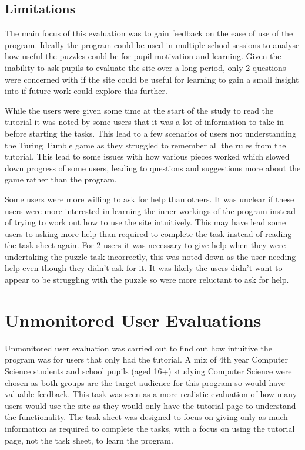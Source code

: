 \documentclass{l4proj}
\begin{document}
\subsection{Limitations}
The main focus of this evaluation was to gain feedback on the ease of use of the program. Ideally the program could be used in multiple school sessions to analyse how useful the puzzles could be for pupil motivation and learning. Given the inability to ask pupils to evaluate the site over a long period, only 2 questions were concerned with if the site could be useful for learning to gain a small insight into if future work could explore this further. 

While the users were given some time at the start of the study to read the tutorial it was noted by some users that it was a lot of information to take in before starting the tasks. This lead to a few scenarios of users not understanding the Turing Tumble game as they struggled to remember all the rules from the tutorial. This lead to some issues with how various pieces worked which slowed down progress of some users, leading to questions and suggestions more about the game rather than the program. 

Some users were more willing to ask for help than others. It was unclear if these users were more interested in learning the inner workings of the program instead of trying to work out how to use the site intuitively. This may have lead some users to asking more help than required to complete the task instead of reading the task sheet again. For 2 users it was necessary to give help when they were undertaking the puzzle task incorrectly, this was noted down as the user needing help even though they didn't ask for it. It was likely the users didn't want to appear to be struggling with the puzzle so were more reluctant to ask for help.  


\section{Unmonitored User Evaluations}
Unmonitored user evaluation was carried out to find out how intuitive the program was for users that only had the tutorial. A mix of 4th year Computer Science students and school pupils (aged 16+) studying Computer Science were chosen as both groups are the target audience for this program so would have valuable feedback. This task was seen as a more realistic evaluation of how many users would use the site as they would only have the tutorial page to understand the functionality. The task sheet was designed to focus on giving only as much information as required to complete the tasks, with a focus on using the tutorial page, not the task sheet, to learn the program. 
\end{document}
